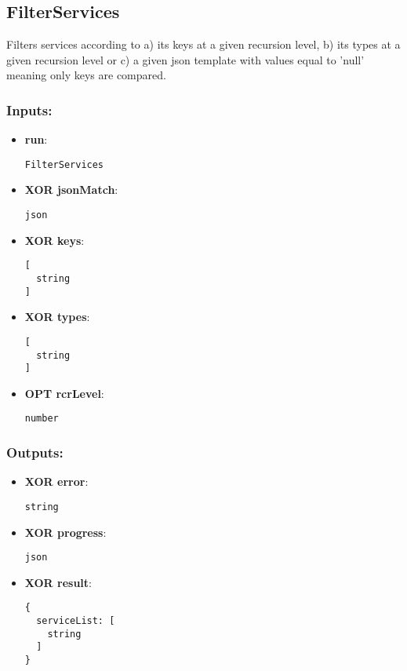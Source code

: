 \subsection{FilterServices}
\label{ch:builtinservices:FilterServices}
Filters
 services according to a) its keys at a given recursion level, b) its 
types at a given recursion level or c) a given json template with values
 equal to 'null' meaning only keys are compared.
\subsubsection*{Inputs:}
\begin{itemize}
    \item \textbf{run}: 
\begin{lstlisting}
FilterServices
\end{lstlisting}
    \item \textbf{XOR jsonMatch}: 
\begin{lstlisting}
json
\end{lstlisting}
    \item \textbf{XOR keys}: 
\begin{lstlisting}
[
  string
]
\end{lstlisting}
    \item \textbf{XOR types}: 
\begin{lstlisting}
[
  string
]
\end{lstlisting}
    \item \textbf{OPT rcrLevel}: 
\begin{lstlisting}
number
\end{lstlisting}
  \end{itemize}

\subsubsection*{Outputs:}
\begin{itemize}
    \item \textbf{XOR error}: 
\begin{lstlisting}
string
\end{lstlisting}
    \item \textbf{XOR progress}: 
\begin{lstlisting}
json
\end{lstlisting}
    \item \textbf{XOR result}: 
\begin{lstlisting}
{
  serviceList: [
    string
  ]
}
\end{lstlisting}
  \end{itemize}

